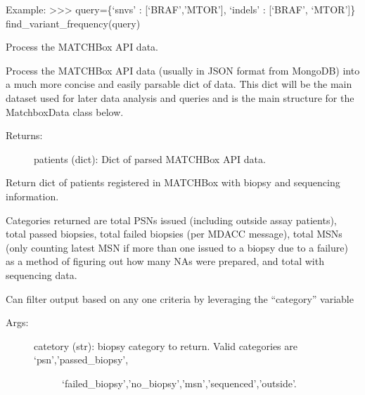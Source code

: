 \documentclass[letterpaper,10pt,english]{sphinxmanual}
\begin{document}
\begin{fulllineitems}
\begin{fulllineitems}
Example:
\textgreater{}\textgreater{}\textgreater{} query=\{‘snvs’ : {[}‘BRAF’,’MTOR’{]}, ‘indels’ : {[}‘BRAF’, ‘MTOR’{]}\}
find\_variant\_frequency(query)

\end{fulllineitems}


\begin{fulllineitems}
\label{\detokenize{matchbox_api_utils:matchbox_api_utils.MatchData.gen_patients_list}}
Process the MATCHBox API data.

Process the MATCHBox API data (usually in JSON format from MongoDB) into
a much more concise and easily parsable dict of data. This dict will be
the main dataset used for later data analysis and queries and is the main
structure for the MatchboxData class below.
\begin{description}
\item[{Returns:}] \leavevmode
patients (dict): Dict of parsed MATCHBox API data.

\end{description}

\end{fulllineitems}


\begin{fulllineitems}
\label{\detokenize{matchbox_api_utils:matchbox_api_utils.MatchData.get_biopsy_summary}}
Return dict of patients registered in MATCHBox with biopsy and sequencing
information.

Categories returned are total PSNs issued (including outside
assay patients), total passed biopsies, total failed biopsies (per MDACC
message), total MSNs (only counting latest MSN if more than one issued to
a biopsy due to a failure) as a method of figuring out how many NAs were
prepared, and total with sequencing data.

Can filter output based on any one criteria by leveraging the “category”
variable
\begin{description}
\item[{Args:}] \leavevmode\begin{description}
\item[{catetory (str): biopsy category to return. Valid categories are ‘psn’,’passed\_biopsy’,}] \leavevmode
‘failed\_biopsy’,’no\_biopsy’,’msn’,’sequenced’,’outside’.


\end{description}
\end{description}
\end{fulllineitems}
\end{fulllineitems}
\end{document}
